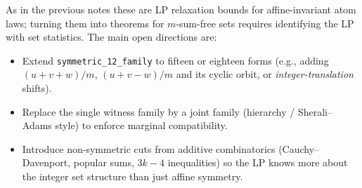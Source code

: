 \documentclass[11pt]{article}
\begin{document}
As in the previous notes these are LP relaxation bounds for affine-invariant
atom laws; turning them into theorems for $m$-sum-free sets requires
identifying the LP with set statistics. The main open directions are:

\begin{itemize}
\item[(i)] Extend \texttt{symmetric\_12\_family} to fifteen or eighteen forms
(e.g., adding $(u+v+w)/m$, $(u+v-w)/m$ and its cyclic orbit, or
\emph{integer-translation} shifts).
\item[(ii)] Replace the single witness family by a joint family (hierarchy /
Sherali--Adams style) to enforce marginal compatibility.
\item[(iii)] Introduce non-symmetric cuts from additive combinatorics
(Cauchy--Davenport, popular sums, $3k-4$ inequalities) so the LP knows more
about the integer set structure than just affine symmetry.
\end{itemize}
\end{document}
